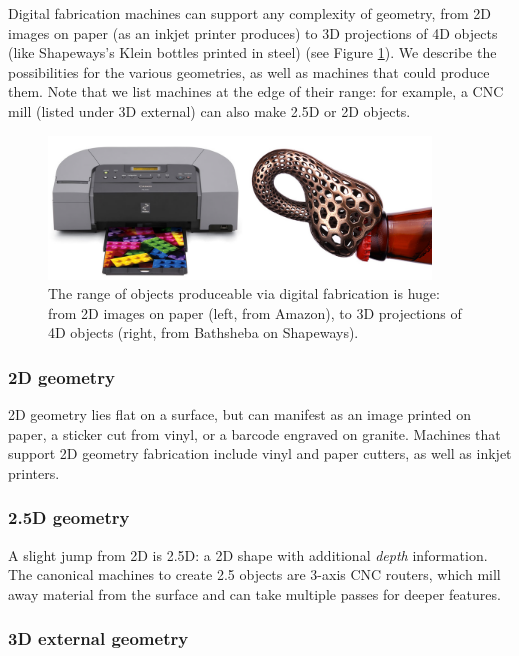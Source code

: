 Digital fabrication machines can support any complexity of geometry, from 2D images on paper (as an inkjet printer produces) to 3D projections of 4D objects (like Shapeways's Klein bottles printed in steel) (see Figure \ref{fig:range}). We describe the possibilities for the various geometries, as well as machines that could produce them. Note that we list machines at the edge of their range: for example, a CNC mill (listed under 3D external) can also make 2.5D or 2D objects.

\begin{figure}
\centering
\includegraphics[width=4in]{figures/range.png}
\caption{The range of objects produceable via digital fabrication is huge: from 2D images on paper (left, from Amazon), to 3D projections of 4D objects (right, from Bathsheba on Shapeways).}
\label{fig:range}
\end{figure}

\subsubsection{2D geometry}

2D geometry lies flat on a surface, but can manifest as an image printed on paper, a sticker cut from vinyl, or a barcode engraved on granite. Machines that support 2D geometry fabrication include vinyl and paper cutters, as well as inkjet printers.

\subsubsection{2.5D geometry}

A slight jump from 2D is 2.5D: a 2D shape with additional \emph{depth} information. The canonical machines to create 2.5 objects are 3-axis CNC routers, which mill away material from the surface and can take multiple passes for deeper features.

\subsubsection{3D external geometry}

